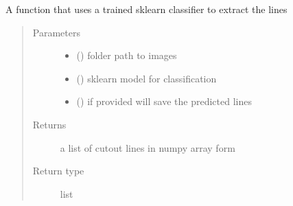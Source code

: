 \documentclass[letterpaper,10pt,english]{sphinxmanual}
\begin{document}
\begin{fulllineitems}
\label{\detokenize{api:readpyne.model.extract}}
A function that uses a trained sklearn classifier to extract the lines
\begin{quote}\begin{description}
\item[{Parameters}] \leavevmode\begin{itemize}
\item {} 
 () \textendash{} folder path to images

\item {} 
 () \textendash{} sklearn model for classification

\item {} 
 () \textendash{} if provided will save the predicted lines

\end{itemize}

\item[{Returns}] \leavevmode
a list of cutout lines in numpy array form

\item[{Return type}] \leavevmode
list

\end{description}\end{quote}

\end{fulllineitems}

\end{document}
